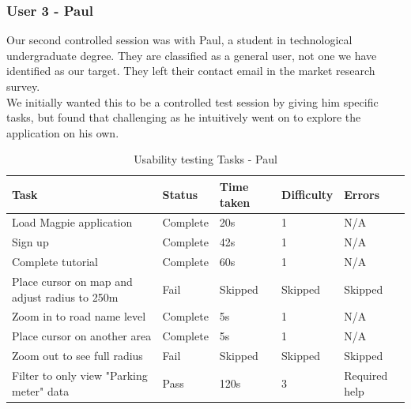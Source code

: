 \subsubsection{User 3 - Paul}
Our second controlled session was with Paul, a student in technological undergraduate degree. They are classified as a general user, not one we have identified as our target. They left their contact email in the market research survey.\\
We initially wanted this to be a controlled test session by giving him specific tasks, but found that challenging as he intuitively went on to explore the application on his own.
\begin{table}[h!]
    \centering
    \caption{Usability testing Tasks - Paul}
    \begin{tabular}{|p{}|p{}|p{}|p{}|p{}|}
        \hline
        \textbf{Task}                                 & \textbf{Status} & \textbf{Time taken} & \textbf{Difficulty} & \textbf{Errors}    \\
        \hline
        Load Magpie application                       & Complete        & 20s                 & 1                   & N/A                \\
        \hline
        Sign up                                       & Complete        & 42s                 & 1                   & N/A                \\
        \hline
        Complete tutorial                             & Complete        & 60s                 & 1                   & N/A                \\
        \hline
        Place cursor on map and adjust radius to 250m & Fail            & Skipped             & Skipped             & Skipped            \\
        \hline
        Zoom in to road name level                    & Complete        & 5s                  & 1                   & N/A                \\
        \hline
        Place cursor on another area                  & Complete        & 5s                  & 1                   & N/A                \\
        \hline
        Zoom out to see full radius                   & Fail            & Skipped             & Skipped             & Skipped            \\
        \hline
        Filter to only view "Parking meter" data      & Pass            & 120s                & 3                   & Required help      \\

\end{tabular}
\end{table}
